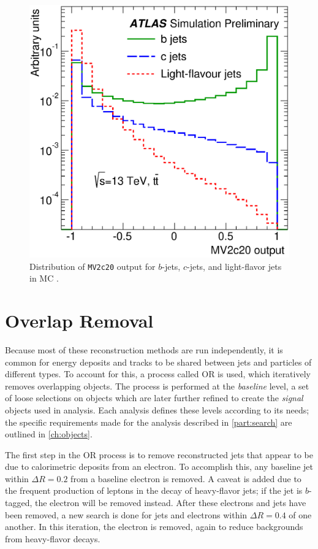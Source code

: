 \begin{centering}
\begin{figure}[!hbt]
\myfloatalign
\includegraphics[width=.9\linewidth]{figures/reco/fig_08.eps}
\caption{ Distribution of \texttt{MV2c20} output for $b$-jets, $c$-jets, and light-flavor jets in \ttbar \ac{MC} \cite{ATL-PHYS-PUB-2015-022}. }
\label{fig:reco_mv2}
\end{figure}
\end{centering}

\section{Overlap Removal}
\label{sec:reco_or}

Because most of these reconstruction methods are run independently, it is common for energy deposits and tracks to be shared between jets and particles of different types. To account for this, a process called \acf{OR} is used, which iteratively removes overlapping objects. The process is performed at the \textit{baseline} level, a set of loose selections on objects which are later further refined to create the \textit{signal} objects used in analysis. Each analysis defines these levels according to its needs; the specific requirements made for the analysis described in \autoref{part:search} are outlined in \autoref{ch:objects}.

The first step in the \ac{OR} process is to remove reconstructed jets that appear to be due to calorimetric deposits from an electron. To accomplish this, any baseline jet within $\Delta R = 0.2$ from a baseline electron is removed. A caveat is added due to the frequent production of leptons in the decay of heavy-flavor jets; if the jet is $b$-tagged, the electron will be removed instead. After these electrons and jets have been removed, a new search is done for jets and electrons within $\Delta R = 0.4$ of one another. In this iteration, the electron is removed, again to reduce backgrounds from heavy-flavor decays.

